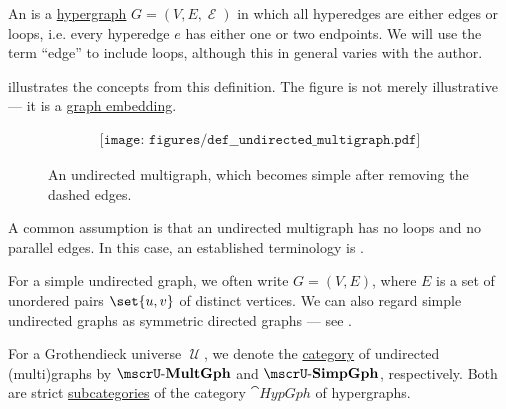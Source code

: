 \begin{definition}\label{def:undirected_multigraph}
  An  is a \hyperref[def:hypergraph]{hypergraph} \( G = (V, E, \mscrE) \) in which all hyperedges are either edges or loops, i.e. every hyperedge \( e \) has either one or two endpoints. We will use the term \enquote{edge} to include loops, although this in general varies with the author.

   illustrates the concepts from this definition. The figure is not merely illustrative --- it is a \hyperref[def:quiver_geometric_realization/embedding]{graph embedding}.

  \begin{figure}[h]
    \begin{equation}\label{eq:fig:def:undirected_multigraph}
      \begin{aligned}
        \texttt{[image: figures/def\_\_undirected\_multigraph.pdf]}
      \end{aligned}
    \end{equation}
    \caption{An undirected multigraph, which becomes simple after removing the dashed edges.}\label{fig:def:undirected_multigraph}
  \end{figure}

  \begin{thmenum}
     A common assumption is that an undirected multigraph has no loops and no parallel edges. In this case, an established terminology is .

    For a simple undirected graph, we often write \( G = (V, E) \), where \( E \) is a set of unordered pairs \( \set{ u, v } \) of distinct vertices. We can also regard simple undirected graphs as symmetric directed graphs --- see .

     For a Grothendieck universe \( \mscrU \), we denote the \hyperref[def:category]{category} of undirected (multi)graphs by \( \ucat{MultGph} \) and \( \ucat{SimpGph} \), respectively. Both are strict \hyperref[def:subcategory]{subcategories} of the category \hyperref[def:category_of_small_hypergraphs]{\( \cat{HypGph} \)} of hypergraphs.
  \end{thmenum}
\end{definition}

